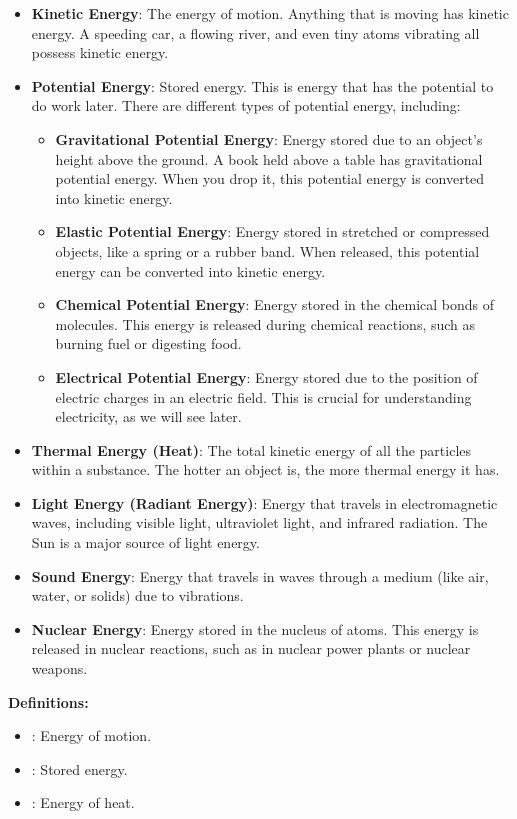\begin{itemize}
    \item \textbf{Kinetic Energy}: The energy of motion. Anything that is moving has kinetic energy. A speeding car, a flowing river, and even tiny atoms vibrating all possess kinetic energy.
    \item \textbf{Potential Energy}: Stored energy. This is energy that has the potential to do work later. There are different types of potential energy, including:
    \begin{itemize}
        \item \textbf{Gravitational Potential Energy}: Energy stored due to an object's height above the ground. A book held above a table has gravitational potential energy. When you drop it, this potential energy is converted into kinetic energy.
        \item \textbf{Elastic Potential Energy}: Energy stored in stretched or compressed objects, like a spring or a rubber band. When released, this potential energy can be converted into kinetic energy.
        \item \textbf{Chemical Potential Energy}: Energy stored in the chemical bonds of molecules. This energy is released during chemical reactions, such as burning fuel or digesting food.
        \item \textbf{Electrical Potential Energy}: Energy stored due to the position of electric charges in an electric field. This is crucial for understanding electricity, as we will see later.
    \end{itemize}
    \item \textbf{Thermal Energy (Heat)}: The total kinetic energy of all the particles within a substance. The hotter an object is, the more thermal energy it has.
    \item \textbf{Light Energy (Radiant Energy)}: Energy that travels in electromagnetic waves, including visible light, ultraviolet light, and infrared radiation. The Sun is a major source of light energy.
    \item \textbf{Sound Energy}: Energy that travels in waves through a medium (like air, water, or solids) due to vibrations.
    \item \textbf{Nuclear Energy}: Energy stored in the nucleus of atoms. This energy is released in nuclear reactions, such as in nuclear power plants or nuclear weapons.
\end{itemize}

\begin{marginnote}
\textbf{Definitions:}
\begin{itemize}
    \item {}: Energy of motion.
    \item {}: Stored energy.
    \item {}: Energy of heat.
\end{itemize}
\end{marginnote}

